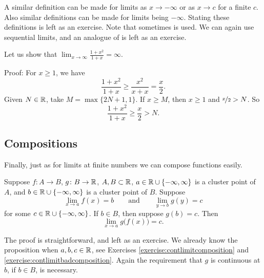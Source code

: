 A similar definition can be made for limits as $x \to -\infty$
or as $x \to c$ for a finite $c$.  Also similar definitions can be
made for limits being $-\infty$.  Stating these definitions is left
as an exercise.
Note that
sometimes \emph{} is used.
We can again use sequential limits, and an analogue of 
 is left as an exercise.

\begin{example}
Let us show that $\lim_{x \to \infty} \frac{1+x^2}{1+x} = \infty$.

Proof: For $x \geq 1$, we have
\begin{equation*}
\frac{1+x^2}{1+x} \geq 
\frac{x^2}{x+x}  = 
\frac{x}{2} .
\end{equation*}
Given $N \in {\mathbb{R}}$, take $M = \max \{ 2N+1 , 1 \}$.
If $x \geq M$, then $x \geq 1$ and $\nicefrac{x}{2} > N$.
So
\begin{equation*}
\frac{1+x^2}{1+x} \geq 
\frac{x}{2} > N .
\end{equation*}
\end{example}

\subsection{Compositions}

Finally, just as for limits at finite numbers we can compose functions
easily.

\begin{prop} \label{prop:inflimcompositions}
Suppose $f \colon A \to B$, $g \colon B \to {\mathbb{R}}$, $A, B \subset {\mathbb{R}}$, 
$a \in {\mathbb{R}} \cup \{ -\infty, \infty\}$ is a cluster point of $A$,
and $b \in {\mathbb{R}} \cup \{ -\infty, \infty\}$ is a cluster point of $B$.
Suppose 
\begin{equation*}
\lim_{x \to a} f(x) = b\qquad \text{and} \qquad \lim_{y \to b} g(y) = c
\end{equation*}
for some $c \in {\mathbb{R}} \cup \{ -\infty, \infty \}$.
If $b \in B$, then suppose $g(b) = c$.
Then
\begin{equation*}
\lim_{x \to a} g\bigl(f(x)\bigr) = c .
\end{equation*}
\end{prop}

The proof is straightforward, and left as an exercise.  We already
know the proposition when $a, b, c \in {\mathbb{R}}$, see Exercises
\ref{exercise:contlimitcomposition} and
\ref{exercise:contlimitbadcomposition}.  Again the requirement that $g$ is
continuous at $b$, if $b \in B$, is necessary.

